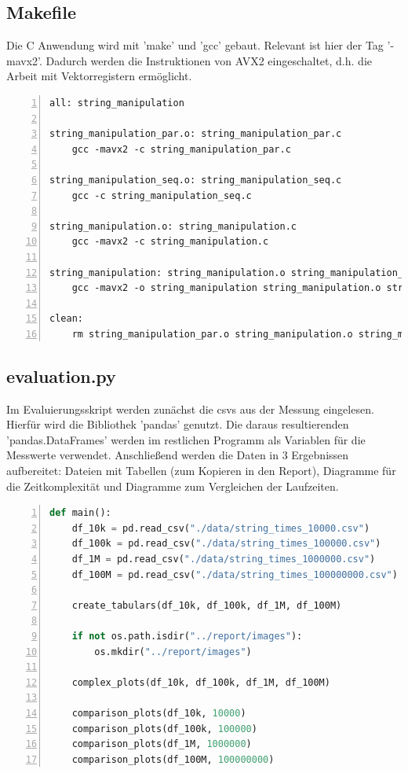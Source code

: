 \documentclass[plainarticle,zihtitle,german,final,hyperref,utf8]{zihpub}
\begin{document}
\subsection{Makefile}
Die C Anwendung wird mit 'make' und 'gcc' gebaut. Relevant ist hier der Tag '-mavx2'. Dadurch werden die Instruktionen von AVX2 eingeschaltet, d.h. die Arbeit mit Vektorregistern ermöglicht.
\begin{lstlisting}[numbers=left, basicstyle=\tiny]
all: string_manipulation

string_manipulation_par.o: string_manipulation_par.c
	gcc -mavx2 -c string_manipulation_par.c

string_manipulation_seq.o: string_manipulation_seq.c
	gcc -c string_manipulation_seq.c

string_manipulation.o: string_manipulation.c
	gcc -mavx2 -c string_manipulation.c

string_manipulation: string_manipulation.o string_manipulation_par.o string_manipulation_seq.o
	gcc -mavx2 -o string_manipulation string_manipulation.o string_manipulation_seq.o string_manipulation_par.o

clean:
	rm string_manipulation_par.o string_manipulation.o string_manipulation_seq.o string_manipulation
\end{lstlisting}

\subsection{evaluation.py}\label{subsec:eval}
Im Evaluierungsskript werden zunächst die csvs aus der Messung eingelesen. Hierfür wird die Bibliothek 'pandas' genutzt. Die daraus resultierenden 'pandas.DataFrames' werden im restlichen Programm als Variablen für die Messwerte verwendet.
Anschließend werden die Daten in 3 Ergebnissen aufbereitet: Dateien mit Tabellen (zum Kopieren in den Report), Diagramme für die Zeitkomplexität und Diagramme zum Vergleichen der Laufzeiten.

\begin{lstlisting}[language=python, numbers=left]
def main():
	df_10k = pd.read_csv("./data/string_times_10000.csv")
	df_100k = pd.read_csv("./data/string_times_100000.csv")
	df_1M = pd.read_csv("./data/string_times_1000000.csv")
	df_100M = pd.read_csv("./data/string_times_100000000.csv")

	create_tabulars(df_10k, df_100k, df_1M, df_100M)

	if not os.path.isdir("../report/images"):
		os.mkdir("../report/images")

	complex_plots(df_10k, df_100k, df_1M, df_100M)

	comparison_plots(df_10k, 10000)
	comparison_plots(df_100k, 100000)
	comparison_plots(df_1M, 1000000)
	comparison_plots(df_100M, 100000000)
\end{lstlisting}
\end{document}

